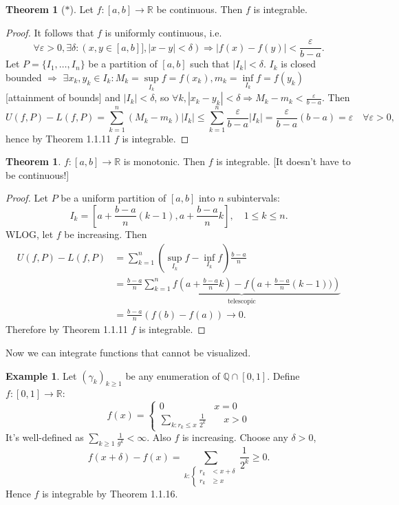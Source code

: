 \documentclass[a4paper]{article}
\theoremstyle{definition}
\newtheorem{thm}[defn]{Theorem}
\newtheorem{example}[defn]{Example}
\begin{document}
\begin{thm}[$\ast$]
	Let $f:[a,b]\rightarrow \mathbb R$ be continuous. Then $f$ is integrable.
\end{thm}

\begin{proof}
	It follows that $f$ is uniformly continuous, i.e.
\[
\forall \varepsilon >0, \exists \delta: (x,y\in [a,b]], |x-y|<\delta) \Rightarrow |f(x)-f(y)|<\frac{\varepsilon}{b-a} .
\]
Let $P=\{I_1,\ldots,I_n\}$ be a partition of $[a,b]$ such that $|I_k|<\delta$. $I_k$ is closed bounded $\Rightarrow$ $\exists x_k,y_k \in I_k : M_k = \underset{I_k}{\sup} f= f(x_k), m_k = \underset{I_k}{\inf} f= f(y_k)$ [attainment of bounds] and $|I_k|<\delta$, so $\forall k, |x_k-y_k|<\delta \Rightarrow M_k-m_k < \frac{\varepsilon}{b-a}$. Then
\[
U(f,P)-L(f,P) = \sum_{k=1}^{n}(M_k-m_k)|I_k| \leq \sum_{k=1}^n \frac{\varepsilon}{b-a}|I_k|=\frac{\varepsilon}{b-a}(b-a)=\varepsilon \quad \forall \varepsilon>0 ,
\]
hence by Theorem 1.1.11 $f$ is integrable.
\end{proof}

\begin{thm}
	$f:[a,b]\rightarrow \mathbb R$ is monotonic. Then $f$ is integrable. [It doesn't have to be continuous!]
\end{thm}
\begin{proof}
	Let $P$ be a uniform partition of $[a,b]$ into $n$ subintervals:
\[
I_k=\left[a+\frac{b-a}{n}(k-1),a+\frac{b-a}{n}k\right], \quad 1 \leq k \leq n .
\]
WLOG, let $f$ be increasing. Then
\[
\begin{aligned}
		U(f,P)-L(f,P)&=\sum_{k=1}^n \left( \underset{I_k}{\sup} f-\underset{I_k}{\inf} f \right) \frac{b-a}{n} \\ &=\frac{b-a}{n} \underbrace{\sum_{k=1}^n f\left( a+\frac{b-a}{n}k \right)-f\left( a+\frac{b-a}{n}(k-1)) \right)}_{\text{telescopic}} \\&= \frac{b-a}{n}(f(b)-f(a)) \rightarrow 0 .
	\end{aligned}
\]
Therefore by Theorem 1.1.11 $f$ is integrable.
\end{proof}

Now we can integrate functions that cannot be visualized.

\begin{example}
	Let $(\gamma_k)_{k\geq 1}$ be any enumeration of $\mathbb Q \cap [0,1]$. Define $f:[0,1]\rightarrow \mathbb R$:
\[
f(x)=\left\{ \begin{aligned}
		0 \quad &x=0 \\ \sum_{k: r_k \leq x} \frac{1}{2^k} &\quad x>0
	\end{aligned} \right.
\]
It's well-defined as $\sum_{k\geq 1} \frac1{g^k} < \infty$. Also $f$ is increasing. Choose any $\delta >0$,
\[
f(x+\delta)-f(x) = \sum_{k:\left\{\begin{aligned}r_k&<x+\delta\\ r_k&\geq x\end{aligned}\right.} \frac{1}{2^k} \geq 0 .
\]
Hence $f$ is integrable by Theorem 1.1.16.
\end{example}
\end{document}

